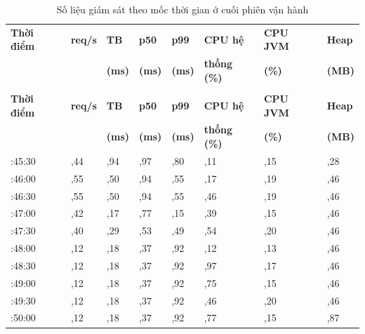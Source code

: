 \documentclass[12pt,a4paper,oneside]{report}
\begin{document}
\renewcommand{\arraystretch}{1.15}
{\small
\begin{longtable}{|>{\centering\arraybackslash}p{1.9cm}|>{\centering\arraybackslash}p{1.2cm}|>{\centering\arraybackslash}p{1.5cm}|>{\centering\arraybackslash}p{1.5cm}|>{\centering\arraybackslash}p{1.5cm}|>{\centering\arraybackslash}p{1.8cm}|>{\centering\arraybackslash}p{1.5cm}|>{\centering\arraybackslash}p{1.6cm}|}
\caption{Số liệu giám sát theo mốc thời gian ở cuối phiên vận hành}\label{tab:monitoring}\\
\hline \textbf{Thời điểm} & \textbf{req/s} & \textbf{TB} & \textbf{p50} & \textbf{p99} & \textbf{CPU hệ} & \textbf{CPU JVM} & \textbf{Heap} \\
 & & \textbf{(ms)} & \textbf{(ms)} & \textbf{(ms)} & \textbf{thống (\%)} & \textbf{(\%)} & \textbf{(MB)} \\ \hline
\endfirsthead
\multicolumn{8}{l}{\itshape\small (tiếp theo trang trước)}\\[2pt]
\hline \textbf{Thời điểm} & \textbf{req/s} & \textbf{TB} & \textbf{p50} & \textbf{p99} & \textbf{CPU hệ} & \textbf{CPU JVM} & \textbf{Heap} \\
 & & \textbf{(ms)} & \textbf{(ms)} & \textbf{(ms)} & \textbf{thống (\%)} & \textbf{(\%)} & \textbf{(MB)} \\ \hline
\endhead
\hline
\endlastfoot
15:45:30 & 0,44 & 29,94 & 21,97 & 195,80 & 7,11 & 1,15 & 161,28 \\ \hline
15:46:00 & 0,55 & 31,50 & 21,94 & 255,55 & 16,17 & 0,19 & 154,46 \\ \hline
15:46:30 & 0,55 & 31,50 & 21,94 & 255,55 & 15,46 & 0,19 & 178,46 \\ \hline
15:47:00 & 0,42 & 31,17 & 23,77 & 197,15 & 13,39 & 0,15 & 203,46 \\ \hline
15:47:30 & 0,40 & 31,29 & 23,53 & 198,49 & 9,54 & 0,20 & 228,46 \\ \hline
15:48:00 & 0,12 & 42,18 & 22,37 & 260,92 & 7,12 & 0,13 & 253,46 \\ \hline
15:48:30 & 0,12 & 42,18 & 22,37 & 260,92 & 4,97 & 0,17 & 278,46 \\ \hline
15:49:00 & 0,12 & 42,18 & 22,37 & 260,92 & 10,75 & 0,15 & 302,46 \\ \hline
15:49:30 & 0,12 & 42,18 & 22,37 & 260,92 & 11,46 & 0,20 & 328,46 \\ \hline
15:50:00 & 0,12 & 42,18 & 22,37 & 260,92 & 10,77 & 0,15 & 144,87 \\ \hline
\end{longtable}
}
\renewcommand{\arraystretch}{1}
\end{document}
